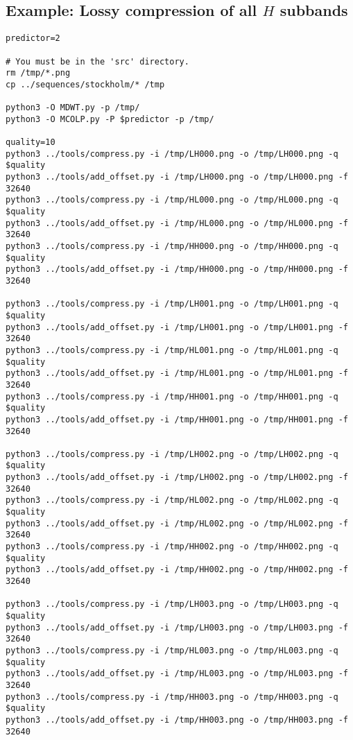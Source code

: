 
\subsection*{Example: Lossy compression of all $H$ subbands}

\begin{verbatim}
predictor=2

# You must be in the 'src' directory.
rm /tmp/*.png
cp ../sequences/stockholm/* /tmp

python3 -O MDWT.py -p /tmp/
python3 -O MCOLP.py -P $predictor -p /tmp/

quality=10
python3 ../tools/compress.py -i /tmp/LH000.png -o /tmp/LH000.png -q $quality
python3 ../tools/add_offset.py -i /tmp/LH000.png -o /tmp/LH000.png -f 32640
python3 ../tools/compress.py -i /tmp/HL000.png -o /tmp/HL000.png -q $quality
python3 ../tools/add_offset.py -i /tmp/HL000.png -o /tmp/HL000.png -f 32640
python3 ../tools/compress.py -i /tmp/HH000.png -o /tmp/HH000.png -q $quality
python3 ../tools/add_offset.py -i /tmp/HH000.png -o /tmp/HH000.png -f 32640

python3 ../tools/compress.py -i /tmp/LH001.png -o /tmp/LH001.png -q $quality
python3 ../tools/add_offset.py -i /tmp/LH001.png -o /tmp/LH001.png -f 32640
python3 ../tools/compress.py -i /tmp/HL001.png -o /tmp/HL001.png -q $quality
python3 ../tools/add_offset.py -i /tmp/HL001.png -o /tmp/HL001.png -f 32640
python3 ../tools/compress.py -i /tmp/HH001.png -o /tmp/HH001.png -q $quality
python3 ../tools/add_offset.py -i /tmp/HH001.png -o /tmp/HH001.png -f 32640

python3 ../tools/compress.py -i /tmp/LH002.png -o /tmp/LH002.png -q $quality
python3 ../tools/add_offset.py -i /tmp/LH002.png -o /tmp/LH002.png -f 32640
python3 ../tools/compress.py -i /tmp/HL002.png -o /tmp/HL002.png -q $quality
python3 ../tools/add_offset.py -i /tmp/HL002.png -o /tmp/HL002.png -f 32640
python3 ../tools/compress.py -i /tmp/HH002.png -o /tmp/HH002.png -q $quality
python3 ../tools/add_offset.py -i /tmp/HH002.png -o /tmp/HH002.png -f 32640

python3 ../tools/compress.py -i /tmp/LH003.png -o /tmp/LH003.png -q $quality
python3 ../tools/add_offset.py -i /tmp/LH003.png -o /tmp/LH003.png -f 32640
python3 ../tools/compress.py -i /tmp/HL003.png -o /tmp/HL003.png -q $quality
python3 ../tools/add_offset.py -i /tmp/HL003.png -o /tmp/HL003.png -f 32640
python3 ../tools/compress.py -i /tmp/HH003.png -o /tmp/HH003.png -q $quality
python3 ../tools/add_offset.py -i /tmp/HH003.png -o /tmp/HH003.png -f 32640


\end{verbatim}
